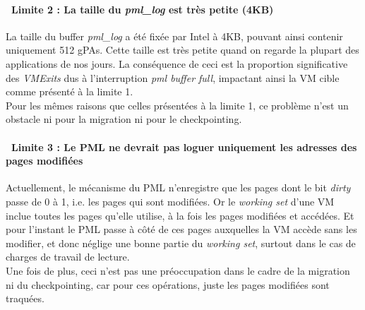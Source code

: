 \paragraph{\textbullet\ \textbf{Limite 2 : La taille du \textit{pml\_log} est très petite (4KB)}}
\par\noindent
\par\noindent La taille du buffer \textit{pml\_log} a été fixée par Intel à 4KB, pouvant ainsi contenir uniquement 512 gPAs. Cette taille est très petite quand on regarde la plupart des applications de nos jours. La conséquence de ceci est la proportion significative des \textit{VMExits} dus à l'interruption \textit{pml buffer full}, impactant ainsi la VM cible comme présenté à la limite 1.\\
Pour les mêmes raisons que celles présentées à la limite 1, ce problème n'est un obstacle ni pour la migration ni pour le checkpointing.

\paragraph{\textbullet\ \textbf{Limite 3 : Le PML ne devrait pas loguer uniquement les adresses des pages modifiées}}
\par\noindent
\par\noindent Actuellement, le mécanisme du PML n'enregistre que les pages dont le bit \textit{dirty} passe de 0 à 1, i.e. les pages qui sont modifiées. Or le \textit{working set} d'une VM inclue toutes les pages qu'elle utilise, à la fois les pages modifiées et accédées. Et pour l'instant le PML passe à côté de ces pages auxquelles la VM accède sans les modifier, et donc néglige une bonne partie du \textit{working set}, surtout dans le cas de charges de travail de lecture.\\
Une fois de plus, ceci n'est pas une préoccupation dans le cadre de la migration ni du checkpointing, car pour ces opérations, juste les pages modifiées sont traquées.

